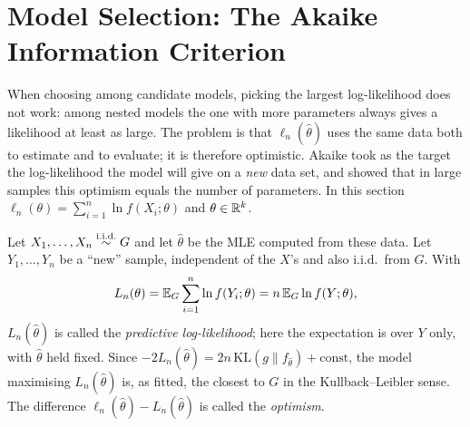 \documentclass[main.tex]{subfiles}
\begin{document}
\section{Model Selection: The Akaike Information Criterion}

When choosing among candidate models, picking the largest log-likelihood does not work: among nested models the one with more parameters always gives a likelihood at least as large. The problem is that $\ell_n(\hat\theta)$ uses the same data both to estimate and to evaluate; it is therefore optimistic. Akaike \cite{akaike73} took as the target the log-likelihood the model will give on a \emph{new} data set, and showed that in large samples this optimism equals the number of parameters. In this section $\ell_n(\theta)=\sum_{i=1}^n\ln f(X_i;\theta)$ and $\theta\in\mathbb{R}^k$.

\begin{definition}\label{def:kestirim-olabilirlik}
Let $X_1,\dots,X_n\overset{\text{i.i.d.}}{\sim} G$ and let $\hat\theta$ be the MLE computed from these data. Let $Y_1,\dots,Y_n$ be a ``new'' sample, independent of the $X$'s and also i.i.d.\ from $G$. With
\[
L_n(\theta)=\mathbb{E}_G\sum_{i=1}^n\ln f(Y_i;\theta)=n\,\mathbb{E}_G\ln f(Y;\theta),
\]
$L_n(\hat\theta)$ is called the \emph{predictive log-likelihood}; here the expectation is over $Y$ only, with $\hat\theta$ held fixed. Since $-2L_n(\hat\theta)=2n\,\mathrm{KL}(g\|f_{\hat\theta})+\text{const}$, the model maximising $L_n(\hat\theta)$ is, as fitted, the closest to $G$ in the Kullback--Leibler sense. The difference $\ell_n(\hat\theta)-L_n(\hat\theta)$ is called the \emph{optimism}.
\end{definition}
\end{document}
